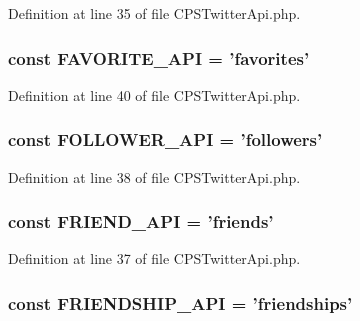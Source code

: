 Definition at line 35 of file CPSTwitterApi.php.

\hypertarget{classCPSTwitterApi_abcf060692f260345e886ed3d78fe56df}{
\subsubsection[{FAVORITE\_\-API}]{\setlength{\rightskip}{0pt plus 5cm}const {\bf FAVORITE\_\-API} = 'favorites'}}
\label{classCPSTwitterApi_abcf060692f260345e886ed3d78fe56df}


Definition at line 40 of file CPSTwitterApi.php.

\hypertarget{classCPSTwitterApi_a4183cb69bce31e4741021ea7a3e9c326}{
\subsubsection[{FOLLOWER\_\-API}]{\setlength{\rightskip}{0pt plus 5cm}const {\bf FOLLOWER\_\-API} = 'followers'}}
\label{classCPSTwitterApi_a4183cb69bce31e4741021ea7a3e9c326}


Definition at line 38 of file CPSTwitterApi.php.

\hypertarget{classCPSTwitterApi_a3fc010ed21ff41fb78f8b0bb606faddb}{
\subsubsection[{FRIEND\_\-API}]{\setlength{\rightskip}{0pt plus 5cm}const {\bf FRIEND\_\-API} = 'friends'}}
\label{classCPSTwitterApi_a3fc010ed21ff41fb78f8b0bb606faddb}


Definition at line 37 of file CPSTwitterApi.php.

\hypertarget{classCPSTwitterApi_a8179b4b95b3d7982e1cf6d713f119651}{
\subsubsection[{FRIENDSHIP\_\-API}]{\setlength{\rightskip}{0pt plus 5cm}const {\bf FRIENDSHIP\_\-API} = 'friendships'}}
\label{classCPSTwitterApi_a8179b4b95b3d7982e1cf6d713f119651}


